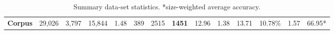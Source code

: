 \documentclass[11pt,a4paper]{article}
\begin{document}
\begin{table*}[h]
{\begin{tabular}{l|llll|llllllll|l}
\textbf{Corpus} & 29,026                                                             & 3,797                                                                & 15,844                                                                & 1.48                                                               & 389              & 2515                  & \textbf{1451}                                                                  & 12.96                                                                              & 1.38                                                                              & 13.71                                                                               & 10.78\%                                                                                   & 1.57                                                                                      & 66.95*                                                                               
\end{tabular}
}
\caption{Summary data-set statistics. *size-weighted average accuracy.}
\label{tab:linguistic}
\end{table*}
 
\end{document}
